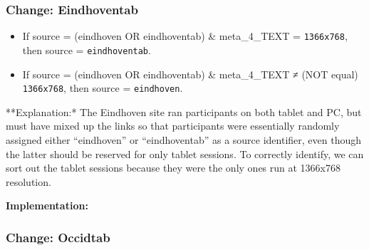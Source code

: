 \documentclass[]{article}
\newenvironment{Shaded}{\begin{snugshade}}{\end{snugshade}}
\newcommand{\KeywordTok}[1]{\textcolor[rgb]{0.94,0.87,0.69}{{#1}}}
\newcommand{\StringTok}[1]{\textcolor[rgb]{0.80,0.58,0.58}{{#1}}}
\newcommand{\NormalTok}[1]{\textcolor[rgb]{0.80,0.80,0.80}{{#1}}}
\begin{document}
\subsubsection{\textbf{Change:} Eindhoventab}\label{change-eindhoventab}

\begin{itemize}
\itemsep1pt\parskip0pt
\item
  If source = (eindhoven OR eindhoventab) \& meta\_4\_TEXT =
  \texttt{1366x768}, then source = \texttt{eindhoventab}.
\item
  If source = (eindhoven OR eindhoventab) \& meta\_4\_TEXT ≠ (NOT equal)
  \texttt{1366x768}, then source = \texttt{eindhoven}.
\end{itemize}

**Explanation:* The Eindhoven site ran participants on both tablet and
PC, but must have mixed up the links so that participants were
essentially randomly assigned either ``eindhoven'' or ``eindhoventab''
as a source identifier, even though the latter should be reserved for
only tablet sessions. To correctly identify, we can sort out the tablet
sessions because they were the only ones run at 1366x768 resolution.

\textbf{Implementation:}

\begin{Shaded}
\end{Shaded}

\subsubsection{\textbf{Change:} Occidtab}\label{change-occidtab}
\end{document}
